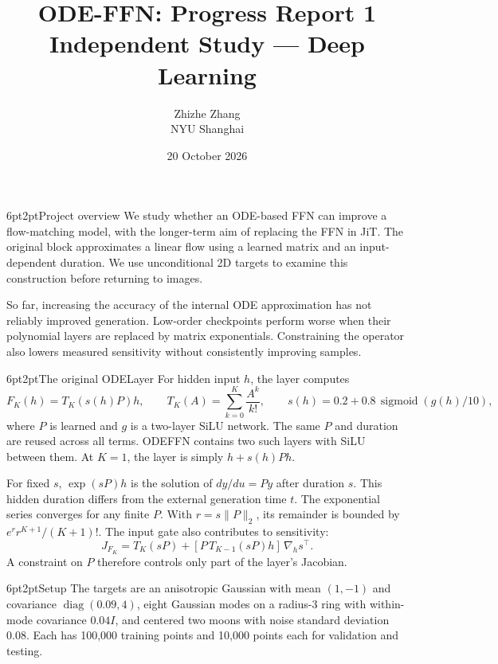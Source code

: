 \documentclass[11pt]{article}
\title{\vspace{-1.6em}\textbf{ODE-FFN: Progress Report 1}\\[3pt]
\large Independent Study --- Deep Learning}
\author{Zhizhe Zhang\\NYU Shanghai}
\date{20 October 2026}
\makeatletter
\renewcommand\section{\@startsection{section}{1}{\z@}%
 {6pt\@plus2pt\@minus2pt}{2pt}{\normalfont\large\bfseries}}
\newcommand{\norm}[1]{\lVert#1\rVert}
\makeatother
\begin{document}
\maketitle
\vspace{-2.8em}

\section{Project overview}
We study whether an ODE-based FFN can improve a flow-matching model, with the
longer-term aim of replacing the FFN in JiT. The original block approximates a
linear flow using a learned matrix and an input-dependent duration. We use
unconditional 2D targets to examine this construction before returning to images.

So far, increasing the accuracy of the internal ODE approximation has not reliably
improved generation. Low-order checkpoints perform worse when their polynomial
layers are replaced by matrix exponentials. Constraining the operator also lowers
measured sensitivity without consistently improving samples.

\section{The original ODELayer}
For hidden input $h$, the layer computes
\begin{equation}
F_K(h)=T_K(s(h)P)h,\qquad T_K(A)=\sum_{k=0}^{K}\frac{A^k}{k!},\qquad
s(h)=0.2+0.8\,\operatorname{sigmoid}(g(h)/10),
\label{eq:layer}
\end{equation}
where $P$ is learned and $g$ is a two-layer SiLU network. The same $P$ and duration
are reused across all terms. ODEFFN contains two such layers with SiLU between
them. At $K=1$, the layer is simply $h+s(h)Ph$.

For fixed $s$, $\exp(sP)h$ is the solution of $dy/du=Py$ after duration $s$.
This hidden duration differs from the external generation time $t$. The
exponential series converges for any finite $P$. With $r=s\norm{P}_2$,
its remainder is bounded by $e^r r^{K+1}/(K+1)!$. The input gate also contributes
to sensitivity:
\begin{equation}
J_{F_K}=T_K(sP)+[P\,T_{K-1}(sP)h]\,\nabla_hs^\top.
\label{eq:jac}
\end{equation}
A constraint on $P$ therefore controls only part of the layer's Jacobian.

\section{Setup}
The targets are an anisotropic Gaussian with mean $(1,-1)$ and covariance
$\operatorname{diag}(0.09,4)$, eight Gaussian modes on a radius-3 ring with
within-mode covariance $0.04I$, and centered two moons with noise standard
deviation $0.08$. Each has 100,000 training points and 10,000 points each for
validation and testing.
\end{document}
